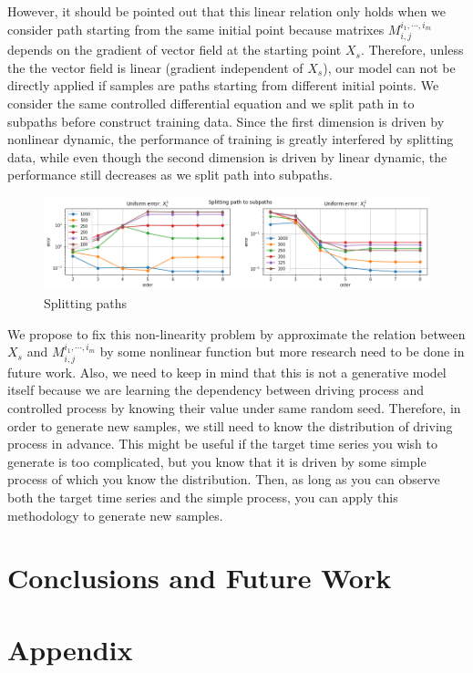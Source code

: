 \documentclass[12pt]{report}
\theoremstyle{definition}
\theoremstyle{remark}
\begin{document}
However, it should be pointed out that this linear relation only holds when we consider path starting from the same initial point because matrixes $M^{i_{1},\cdots,i_{m}}_{i,j}$ depends on the gradient of vector field at the starting point $X_{s}$. Therefore, unless the the vector field is linear (gradient independent of $X_{s}$), our model can not be directly applied if samples are paths starting from different initial points. We consider the same controlled differential equation and we split path in to subpaths before construct training data. Since the first dimension is driven by nonlinear dynamic, the performance of training is greatly interfered by splitting data, while even though the second dimension is driven by linear dynamic, the performance still decreases as we split path into subpaths. 
\begin{figure}[H]
  \centering
  \includegraphics[width=\textwidth]{figs/res7.png}
  \caption{Splitting paths}
\end{figure}
We propose to fix this non-linearity problem by approximate the relation between $X_{s}$ and $M^{i_{1},\cdots,i_{m}}_{i,j}$ by some nonlinear function but more research need to be done in future work. Also, we need to keep in mind that this is not a generative model itself because we are learning the dependency between driving process and controlled process by knowing their value under same random seed. Therefore, in order to generate new samples, we still need to know the distribution of driving process in advance. This might be useful if the target time series you wish to generate is too complicated, but you know that it is driven by some simple process of which you know the distribution. Then, as long as you can observe both the target time series and the simple process, you can apply this methodology to generate new samples.

\chapter{Conclusions and Future Work}


\chapter{Appendix}

\nocite{*}


\end{document}
